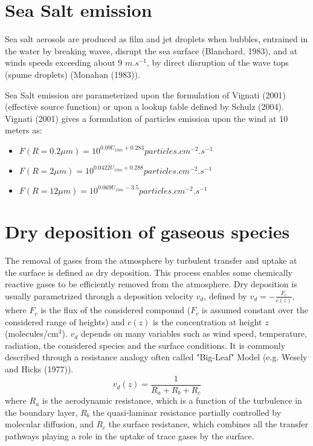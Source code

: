 \section{Sea Salt emission}
Sea salt aerosols are produced as film and jet droplets when bubbles, entrained in the water by breaking waves, disrupt the sea surface (Blanchard, 1983), and at winds speeds exceeding about 9 $m.s^{-1}$, by direct disruption of the wave tops (spume droplets) (Monahan \etal (1983)\nocite{Monahan1983}).

Sea Salt emission are parameterized upon the  formulation of Vignati \etal (2001)\nocite{Vignati2001} (effective source function) or upon a lookup table defined by Schulz \etal (2004)\nocite{Schulz2004}.
Vignati \etal (2001) gives a formulation of particles emission upon the wind at 10 meters as:
\begin{itemize}
\item $F(R=0.2 \mu m) = 10^{0.09 U_{10m} + 0.283} particles.cm^{-2}.s^{-1}$ 
\item $F(R= 2 \mu m) = 10^{0.0422 U_{10m} + 0.288} particles.cm^{-2}.s^{-1}$
\item $F(R= 12 \mu m) = 10^{0.069 U_{10m} - 3.5} particles.cm^{-2}.s^{-1}$
\end{itemize}

\section{Dry deposition of gaseous species}

The removal of gases from the atmosphere by turbulent transfer and uptake at
the surface is defined as dry deposition. This process enables some
chemically reactive gases to be efficiently removed from the atmosphere. 
Dry deposition is usually parametrized through a deposition velocity $v_d$,
defined by $v_d=-\frac{F_c}{c(z)}$, where $F_c$ is the flux of the considered
compound ($F_c$ is assumed constant over the considered range of heights) and
$c(z)$ is the concentration at height $z$ (molecules/cm$^3$). $v_d$ depends
on many variables such as wind speed, temperature, radiation, the considered
species and the surface conditions. It is commonly described
through a resistance analogy often called "Big-Leaf" Model 
(e.g.  Wesely and Hicks (1977)\nocite{Wesely1977}).
\[
v_d(z)=\frac{1}{R_a+R_b+R_c}\]
where $R_a$ is the aerodynamic resistance, which is a function of the
turbulence 
in the boundary layer, $R_b$ the quasi-laminar resistance partially controlled
by molecular diffusion, and $R_c$ the surface
resistance, which combines all the transfer pathways playing a role in the
uptake of trace gases by the surface.

